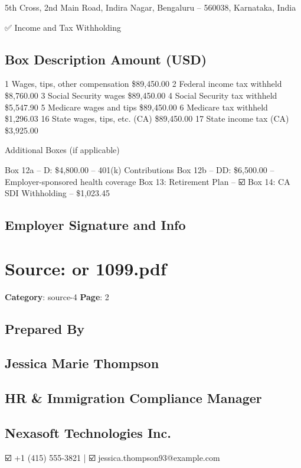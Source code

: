 5th Cross, 2nd Main Road, Indira Nagar, Bengaluru – 560038, Karnataka, India

✅ Income and Tax Withholding

\subsection*{Box Description Amount (USD)}

1 Wages, tips, other compensation \$89,450.00 2 Federal income tax withheld \$8,760.00 3 Social Security wages \$89,450.00 4 Social Security tax withheld \$5,547.90 5 Medicare wages and tips \$89,450.00 6 Medicare tax withheld \$1,296.03 16 State wages, tips, etc. (CA) \$89,450.00 17 State income tax (CA) \$3,925.00

Additional Boxes (if applicable)

Box 12a – D: \$4,800.00 – 401(k) Contributions Box 12b – DD: \$6,500.00 – Employer-sponsored health coverage Box 13: Retirement Plan – ☑️ Box 14: CA SDI Withholding – \$1,023.45

\subsection*{Employer Signature and Info}

\newpage

\section*{Source: or 1099.pdf}
\textbf{Category}: source-4
\textbf{Page}: 2

\subsection*{Prepared By}

\subsection*{Jessica Marie Thompson}

\subsection*{HR \& Immigration Compliance Manager}

\subsection*{Nexasoft Technologies Inc.}

☑️ +1 (415) 555-3821 | ☑️ jessica.thompson93@example.com